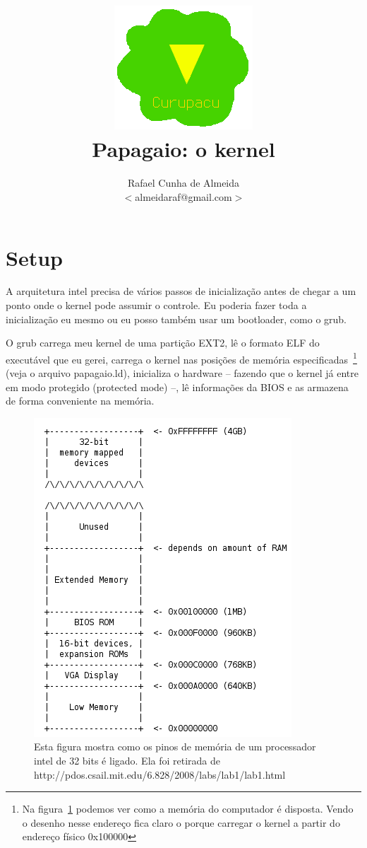 \documentclass{article}
\title{\includegraphics[scale=0.4]{logo}\\
Papagaio: o kernel}
\author{Rafael Cunha de Almeida\\ $<$almeidaraf@gmail.com$>$}
\begin{document}
\maketitle

\section{Setup}
A arquitetura intel precisa de vários passos de inicialização antes de chegar a
um ponto onde o kernel pode assumir o controle. Eu poderia fazer toda a
inicialização eu mesmo ou eu posso também usar um bootloader, como o grub.

O grub carrega meu kernel de uma partição EXT2, lê o formato ELF do executável
que eu gerei, carrega o kernel nas posições de memória
especificadas~\footnote{Na figura~\ref{fig:memoria} podemos ver como a memória
do computador é disposta. Vendo o desenho nesse endereço fica claro o porque
carregar o kernel a partir do endereço físico 0x100000} (veja o arquivo
papagaio.ld), inicializa o hardware -- fazendo que o kernel já entre em modo
protegido (protected mode) --, lê informações da BIOS e as armazena de forma
conveniente na memória.
\begin{figure}
\begin{center}
\includegraphics{memoria.png}
\caption{Esta figura mostra como os pinos de memória de um processador intel de
32 bits é ligado. Ela foi retirada de
http://pdos.csail.mit.edu/6.828/2008/labs/lab1/lab1.html}
\label{fig:memoria}
\end{center}
\end{figure}
\end{document}
